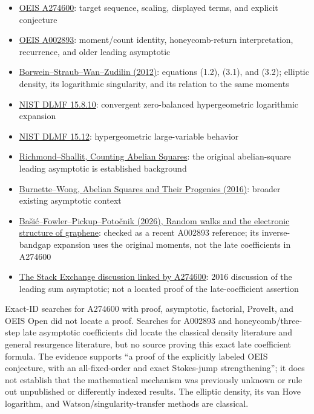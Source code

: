 \documentclass[11pt,letterpaper]{article}
\providecommand{\tightlist}{\setlength{\itemsep}{0pt}\setlength{\parskip}{0pt}}
\theoremstyle{remark}
\begin{document}
\begin{itemize}
\tightlist
\item
  \href{https://oeis.org/A274600}{OEIS A274600}: target sequence,
  scaling, displayed terms, and explicit conjecture
\item
  \href{https://oeis.org/A002893}{OEIS A002893}: moment/count identity,
  honeycomb-return interpretation, recurrence, and older leading
  asymptotic
\item
  \href{https://people.mpim-bonn.mpg.de/zagier/files/doi/10.4153/CJM-2011-079-2/borweinJ0395.pdf}{Borwein--Straub--Wan--Zudilin
  (2012)}: equations (1.2), (3.1), and (3.2); elliptic density, its
  logarithmic singularity, and its relation to the same moments
\item
  \href{https://dlmf.nist.gov/15.8.E10}{NIST DLMF 15.8.10}: convergent
  zero-balanced hypergeometric logarithmic expansion
\item
  \href{https://dlmf.nist.gov/15.12}{NIST DLMF 15.12}: hypergeometric
  large-variable behavior
\item
  \href{https://cs.uwaterloo.ca/~shallit/Papers/cas.pdf}{Richmond--Shallit,
  Counting Abelian Squares}: the original abelian-square leading
  asymptotic is established background
\item
  \href{https://arxiv.org/abs/1609.05580}{Burnette--Wong, Abelian
  Squares and Their Progenies (2016)}: broader existing asymptotic
  context
\item
  \href{https://dirros.openscience.si/Dokument.php?id=41518&lang=eng}{Bašić--Fowler--Pickup--Potočnik
  (2026), Random walks and the electronic structure of graphene}:
  checked as a recent A002893 reference; its inverse-bandgap expansion
  uses the original moments, not the late coefficients in A274600
\item
  \href{https://math.stackexchange.com/questions/2006632/sum-involving-the-product-of-binomial-coefficients}{The
  Stack Exchange discussion linked by A274600}: 2016 discussion of the
  leading sum asymptotic; not a located proof of the late-coefficient
  assertion
\end{itemize}

Exact-ID searches for A274600 with proof, asymptotic, factorial,
ProveIt, and OEIS Open did not locate a proof. Searches for A002893 and
honeycomb/three-step late asymptotic coefficients did locate the
classical density literature and general resurgence literature, but no
source proving this exact late coefficient formula. The evidence
supports ``a proof of the explicitly labeled OEIS conjecture, with an
all-fixed-order and exact Stokes-jump strengthening''; it does not
establish that the mathematical mechanism was previously unknown or rule
out unpublished or differently indexed results. The elliptic density,
its van Hove logarithm, and Watson/singularity-transfer methods are
classical.
\end{document}
